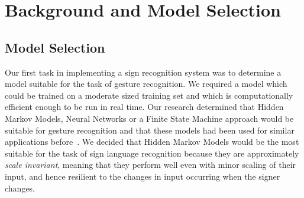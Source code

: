
\chapter{Background and Model Selection}
\ifpdf
    \graphicspath{{Chapter1/Chapter1Figs/PNG/}{Chapter1/Chapter1Figs/PDF/}{Chapter1/Chapter1Figs/}}
\else
    \graphicspath{{Chapter1/Chapter1Figs/EPS/}{Chapter1/Chapter1Figs/}}
\fi

\section{Model Selection}
Our first task in implementing a sign recognition system was to determine a model suitable for the task of gesture recognition. We required a model which could be trained on a moderate sized training set and which is computationally efficient enough to be run in real time. Our research determined that Hidden Markov Models, Neural Networks or a Finite State Machine approach would be suitable for gesture recognition and that these models had been used for similar applications before~\citep{mitra2007gesture}. We decided that Hidden Markov Models would be the most suitable for the task of sign language recognition because they are approximately \emph{scale invariant}, meaning that they perform well even with minor scaling of their input, and hence resilient to the changes in input occurring when the signer changes.

